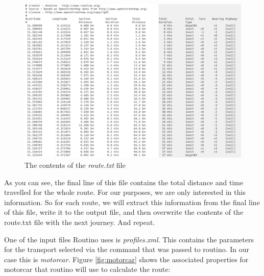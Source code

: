 \documentclass{article}
\begin{document}
\begin{flushleft}
\begin{figure}[!h]
	\centering
	\includegraphics[width=1\textwidth]{images/route_txt.png}
	\caption{The contents of the \textit{route.txt} file}
	\label{fig:route_txt}
\end{figure}

As you can see, the final line of this file contains the total distance and time travelled for the whole route. For our purposes, we are only interested in this information. So for each route, we will extract this information from the final line of this file, write it to the output file, and then overwrite the contents of the route.txt file with the next journey. And repeat.\\

\vspace{\baselineskip}

One of the input files Routino uses is \textit{profiles.xml}. This contains the parameters for the transport selected via the command that was passed to routino. In our case this is \textit{motorcar}. Figure \ref{fig:motorcar} shows the associated properties for motorcar that routino will use to calculate the route:


\end{flushleft}
\end{document}
